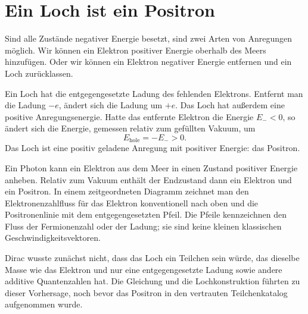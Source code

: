 \section{Ein Loch ist ein Positron}

Sind alle Zustände negativer Energie besetzt, sind zwei Arten von Anregungen möglich. Wir können ein Elektron positiver Energie oberhalb des Meers hinzufügen. Oder wir können ein Elektron negativer Energie entfernen und ein Loch zurücklassen.

Ein Loch hat die entgegengesetzte Ladung des fehlenden Elektrons. Entfernt man die Ladung \(-e\), ändert sich die Ladung um \(+e\). Das Loch hat außerdem eine positive Anregungsenergie. Hatte das entfernte Elektron die Energie \(E_-<0\), so ändert sich die Energie, gemessen relativ zum gefüllten Vakuum, um
\begin{equation}
E_{\mathrm{hole}}=-E_->0.
\end{equation}
Das Loch ist eine positiv geladene Anregung mit positiver Energie: das Positron.

Ein Photon kann ein Elektron aus dem Meer in einen Zustand positiver Energie anheben. Relativ zum Vakuum enthält der Endzustand dann ein Elektron und ein Positron. In einem zeitgeordneten Diagramm zeichnet man den Elektronenzahlfluss für das Elektron konventionell nach oben und die Positronenlinie mit dem entgegengesetzten Pfeil. Die Pfeile kennzeichnen den Fluss der Fermionenzahl oder der Ladung; sie sind keine kleinen klassischen Geschwindigkeitsvektoren.

\begin{classroomqa}
\end{classroomqa}

Dirac wusste zunächst nicht, dass das Loch ein Teilchen sein würde, das dieselbe Masse wie das Elektron und nur eine entgegengesetzte Ladung sowie andere additive Quantenzahlen hat. Die Gleichung und die Lochkonstruktion führten zu dieser Vorhersage, noch bevor das Positron in den vertrauten Teilchenkatalog aufgenommen wurde.

